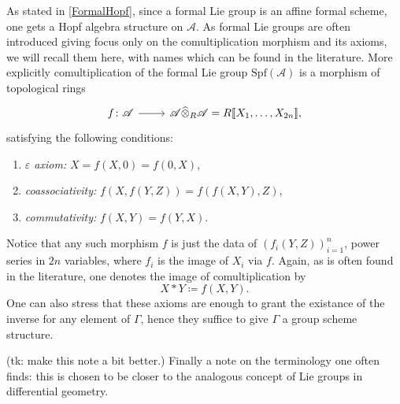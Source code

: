 \documentclass[../Main]{subfiles}
\begin{document}
\begin{rem}[]
	As stated in \cref{FormalHopf}, since a formal Lie group
	is an affine formal scheme, one gets a Hopf algebra structure
	on $\mathscr{A}$.
	As formal Lie groups are often introduced giving focus only
	on the comultiplication morphism and its axioms, we will
	recall them here, with names which can be found in the literature.
	More explicitly comultiplication of the formal Lie group
	$\mathrm{Spf}(\mathscr{A})$ is a morphism of topological rings
	\begin{equation*}
	\begin{tikzcd}[row sep = 0ex
		,/tikz/column 1/.append style={anchor=base east}
		,/tikz/column 2/.append style={anchor=base west}]
		f\colon \mathscr{A} \arrow[r, "", rightarrow] &
		\mathscr{A} \widehat{\otimes}_R \mathscr{A} =
		R [\![ X_1, \ldots, X_{ 2n } ]\!]
	,\end{tikzcd}
	\end{equation*} 
	satisfying the following conditions:
	\begin{enumerate}
		\item {\em $\varepsilon$ axiom:} $X = f(X,0) = f(0,X)$,
		\item {\em coassociativity:} $f(X, f(Y,Z)) = f(f(X,Y), Z)$,
		\item {\em commutativity:} $f(X,Y) = f(Y,X)$.
	\end{enumerate}
	Notice that any such morphism $f$ is just the data of 
	$\left( f_i(Y,Z) \right)_{i=1}^n$, power series in $2n$ variables, where
	$f_i$ is the image of $X_i$ via $f$.
	Again, as is often found in the literature, one denotes the image of
	comultiplication by
	\begin{equation*}
		X \ast Y \coloneqq f(X,Y)
	.\end{equation*} 
	One can also stress that these axioms are enough to grant
	the existance of the inverse for any element of $\Gamma$,
	hence they suffice to give $\Gamma$ a group scheme structure.

	(tk: make this note a bit better.)
	Finally a note on the terminology one often finds: this
	is chosen to be closer to the analogous concept of Lie groups
	in differential geometry.
\end{rem}
\end{document}
